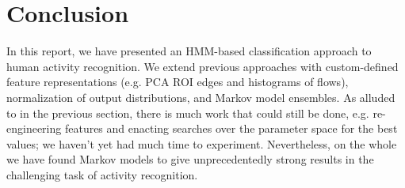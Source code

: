 \documentclass{article}
\begin{document}
\section{Conclusion}

In this report, we have presented an HMM-based classification approach to human activity recognition. We extend previous approaches with custom-defined feature representations (e.g. PCA ROI edges and histograms of flows), normalization of output distributions, and Markov model ensembles. As alluded to in the previous section, there is much work that could still be done, e.g. re-engineering features and enacting searches over the parameter space for the best values; we haven't yet had much time to experiment. Nevertheless, on the whole we have found Markov models to give unprecedentedly strong results in the challenging task of activity recognition.



\end{document}
